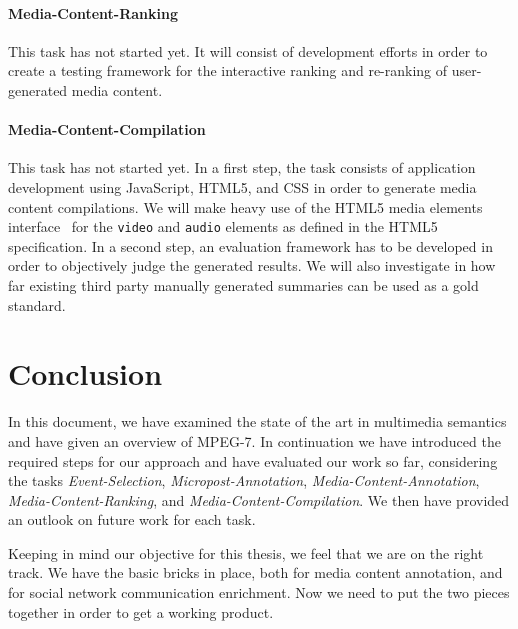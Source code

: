 \documentclass[runningheads,a4paper]{llncs}
\begin{document}
\paragraph{\bf{Media-Content-Ranking}}
This task has not started yet. It will consist of development efforts in order to create a testing framework for the interactive ranking and re-ranking of user-generated media content. 

\paragraph{\bf{Media-Content-Compilation}}
This task has not started yet. In a first step, the task consists of application development using JavaScript, HTML5, and CSS in order to generate media content compilations. We will make heavy use of the HTML5 media elements interface~\cite{mediaelements} for the \texttt{video} and \texttt{audio} elements as defined in the HTML5 specification. In a second step, an evaluation framework has to be developed in order to objectively judge the generated results. We will also investigate in how far existing third party manually generated summaries can be used as a gold standard.
 
\section{Conclusion}
In this document, we have examined the state of the art in multimedia semantics and have given an overview of MPEG-7. In continuation we have introduced the required steps for our approach and have evaluated our work so far, considering the tasks \emph{Event-Selection}, \emph{Micropost-Annotation}, \emph{Media-Content-Annotation}, \emph{Media-Content-Ranking}, and \emph{Media-Content-Compilation}. We then have provided an outlook on future work for each task.

Keeping in mind our objective for this thesis, we feel that we are on the right track. We have the basic bricks in place, both for media content annotation, and for social network communication enrichment. Now we need to put the two pieces together in order to get a working product.



\end{document}
